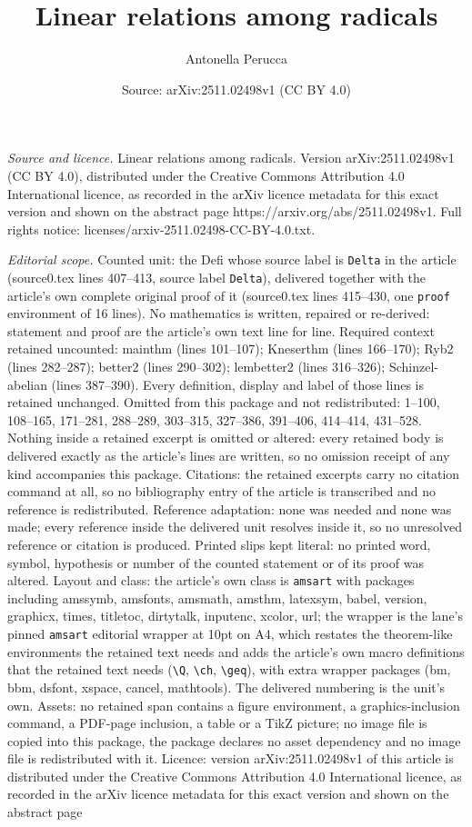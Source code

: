 \documentclass[10pt,a4paper]{amsart}
\title[Linear relations among radicals]{Linear relations among radicals}
\author{Antonella Perucca}
\date{Source: arXiv:2511.02498v1 (CC BY 4.0)}
\begin{document}
\maketitle

\noindent\emph{Source and licence.} Linear relations among radicals. Version arXiv:2511.02498v1 (CC BY 4.0), distributed under the Creative Commons Attribution 4.0 International licence, as recorded in the arXiv licence metadata for this exact version and shown on the abstract page https://arxiv.org/abs/2511.02498v1. Full rights notice: licenses/arxiv-2511.02498-CC-BY-4.0.txt.\par\smallskip

\noindent\textit{Editorial scope.} Counted unit: the Defi whose source label is \texttt{Delta} in the article (source0.tex lines 407--413, source label \texttt{Delta}), delivered together with the article's own complete original proof of it (source0.tex lines 415--430, one \texttt{proof} environment of 16 lines). No mathematics is written, repaired or re-derived: statement and proof are the article's own text line for line. Required context retained uncounted: mainthm (lines 101--107); Kneserthm (lines 166--170); Ryb2 (lines 282--287); better2 (lines 290--302); lembetter2 (lines 316--326); Schinzel-abelian (lines 387--390). Every definition, display and label of those lines is retained unchanged. Omitted from this package and not redistributed: 1--100, 108--165, 171--281, 288--289, 303--315, 327--386, 391--406, 414--414, 431--528. Nothing inside a retained excerpt is omitted or altered: every retained body is delivered exactly as the article's lines are written, so no omission receipt of any kind accompanies this package. Citations: the retained excerpts carry no citation command at all, so no bibliography entry of the article is transcribed and no reference is redistributed. Reference adaptation: none was needed and none was made; every reference inside the delivered unit resolves inside it, so no unresolved reference or citation is produced. Printed slips kept literal: no printed word, symbol, hypothesis or number of the counted statement or of its proof was altered. Layout and class: the article's own class is \texttt{amsart} with packages including amssymb, amsfonts, amsmath, amsthm, latexsym, babel, version, graphicx, times, titletoc, dirtytalk, inputenc, xcolor, url; the wrapper is the lane's pinned \texttt{amsart} editorial wrapper at 10pt on A4, which restates the theorem-like environments the retained text needs and adds the article's own macro definitions that the retained text needs (\texttt{\textbackslash Q}, \texttt{\textbackslash ch}, \texttt{\textbackslash geq}), with extra wrapper packages (bm, bbm, dsfont, xspace, cancel, mathtools). The delivered numbering is the unit's own. Assets: no retained span contains a figure environment, a graphics-inclusion command, a PDF-page inclusion, a table or a TikZ picture; no image file is copied into this package, the package declares no asset dependency and no image file is redistributed with it. Licence: version arXiv:2511.02498v1 of this article is distributed under the Creative Commons Attribution 4.0 International licence, as recorded in the arXiv licence metadata for this exact version and shown on the abstract page 
\end{document}

